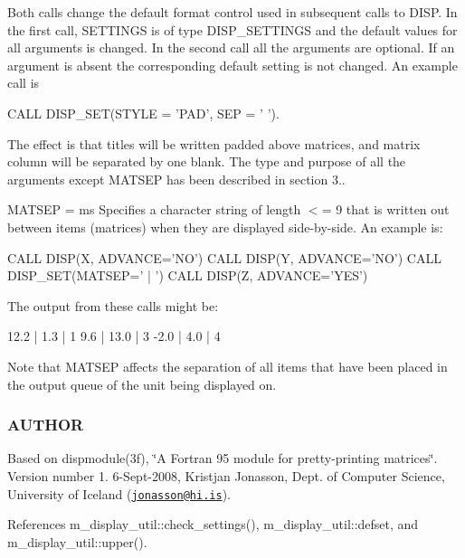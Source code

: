 Both calls change the default format control used in subsequent calls to D\+I\+SP. In the first call, S\+E\+T\+T\+I\+N\+GS is of type D\+I\+S\+P\+\_\+\+S\+E\+T\+T\+I\+N\+GS and the default values for all arguments is changed. In the second call all the arguments are optional. If an argument is absent the corresponding default setting is not changed. An example call is \begin{DoxyVerb}  CALL DISP_SET(STYLE = 'PAD', SEP = ' ').
\end{DoxyVerb}


The effect is that titles will be written padded above matrices, and matrix column will be separated by one blank. The type and purpose of all the arguments except M\+A\+T\+S\+EP has been described in section 3..

M\+A\+T\+S\+EP = ms Specifies a character string of length $<$= 9 that is written out between items (matrices) when they are displayed side-\/by-\/side. An example is\+: \begin{DoxyVerb} CALL DISP(X, ADVANCE='NO')
 CALL DISP(Y, ADVANCE='NO')
 CALL DISP_SET(MATSEP=' | ')
 CALL DISP(Z, ADVANCE='YES')
\end{DoxyVerb}


The output from these calls might be\+: \begin{DoxyVerb} 12.2 |  1.3 | 1
  9.6 | 13.0 | 3
 -2.0 |  4.0 | 4
\end{DoxyVerb}


Note that M\+A\+T\+S\+EP affects the separation of all items that have been placed in the output queue of the unit being displayed on. \subsubsection*{A\+U\+T\+H\+OR}

Based on dispmodule(3f), \char`\"{}\+A Fortran 95 module for pretty-\/printing matrices\char`\"{}. Version number 1. 6-\/\+Sept-\/2008, Kristjan Jonasson, Dept. of Computer Science, University of Iceland (\href{mailto:jonasson@hi.is}{\tt jonasson@hi.\+is}). 

References m\+\_\+display\+\_\+util\+::check\+\_\+settings(), m\+\_\+display\+\_\+util\+::defset, and m\+\_\+display\+\_\+util\+::upper().

\mbox{\label{namespacem__display_a6296917336a62e43005e56c48340eaf1}} 
